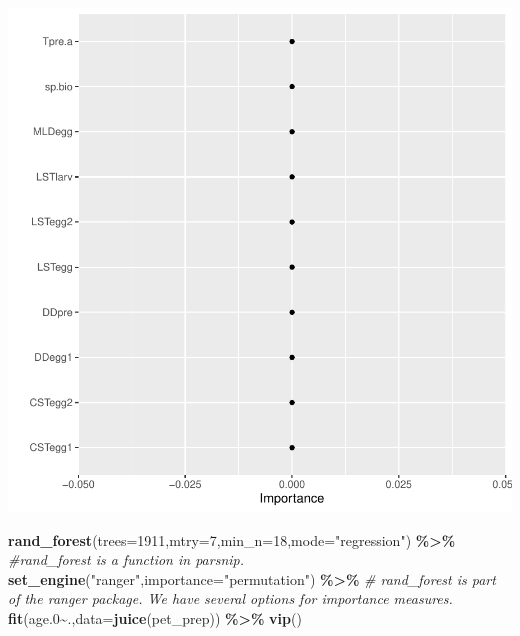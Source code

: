 \documentclass[
]{article}
\newenvironment{Shaded}{\begin{snugshade}}{\end{snugshade}}
\newcommand{\CommentTok}[1]{\textcolor[rgb]{0.56,0.35,0.01}{\textit{#1}}}
\newcommand{\DataTypeTok}[1]{\textcolor[rgb]{0.13,0.29,0.53}{#1}}
\newcommand{\DecValTok}[1]{\textcolor[rgb]{0.00,0.00,0.81}{#1}}
\newcommand{\FloatTok}[1]{\textcolor[rgb]{0.00,0.00,0.81}{#1}}
\newcommand{\KeywordTok}[1]{\textcolor[rgb]{0.13,0.29,0.53}{\textbf{#1}}}
\newcommand{\NormalTok}[1]{#1}
\newcommand{\OperatorTok}[1]{\textcolor[rgb]{0.81,0.36,0.00}{\textbf{#1}}}
\newcommand{\StringTok}[1]{\textcolor[rgb]{0.31,0.60,0.02}{#1}}
\begin{document}
\includegraphics{calcurr_files/figure-latex/unnamed-chunk-14-1.pdf}

\begin{Shaded}
\begin{Highlighting}[]
\KeywordTok{rand\_forest}\NormalTok{(}\DataTypeTok{trees=}\DecValTok{1911}\NormalTok{,}\DataTypeTok{mtry=}\DecValTok{7}\NormalTok{,}\DataTypeTok{min\_n=}\DecValTok{18}\NormalTok{,}\DataTypeTok{mode=}\StringTok{"regression"}\NormalTok{) }\OperatorTok{\%>\%}\StringTok{ }\CommentTok{\#rand\_forest is a function in parsnip.}
\StringTok{  }\KeywordTok{set\_engine}\NormalTok{(}\StringTok{"ranger"}\NormalTok{,}\DataTypeTok{importance=}\StringTok{"permutation"}\NormalTok{) }\OperatorTok{\%>\%}\StringTok{ }\CommentTok{\# rand\_forest is part of the ranger package. We have several options for importance measures.}
\StringTok{  }\KeywordTok{fit}\NormalTok{(age}\FloatTok{.0}\OperatorTok{\textasciitilde{}}\NormalTok{.,}\DataTypeTok{data=}\KeywordTok{juice}\NormalTok{(pet\_prep)) }\OperatorTok{\%>\%}\StringTok{ }
\StringTok{  }\KeywordTok{vip}\NormalTok{()}
\end{Highlighting}
\end{Shaded}
\end{document}
